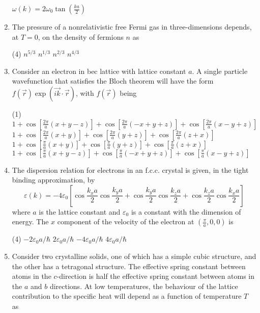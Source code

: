 \begin{enumerate}
\begin{tasks}
\task[\textbf{D.}] $\omega(k)=2 \omega_{0} \tan \left(\frac{k a}{2}\right)$
\end{tasks}
	\item The pressure of a nonrelativistic free Fermi gas in three-dimensions depends, at $T=0$, on the density of fermions $n$ as
	{}
\begin{tasks}(4)
\task[\textbf{A.}] $n^{5 / 3}$
\task[\textbf{B.}] $n^{1 / 3}$
\task[\textbf{C.}] $n^{2 / 3}$
\task[\textbf{D.}] $n^{4 / 3}$
\end{tasks}
	\item Consider an electron in bec lattice with lattice constant $a$. A single particle wavefunction that satisfies the Bloch theorem will have the form $f(\vec{r}) \exp (\overrightarrow{i k} \cdot \vec{r})$, with $f(\vec{r})$ being
	{}
\begin{tasks}(1)
\task[\textbf{A.}] $1+\cos \left[\frac{2 \pi}{a}(x+y-z)\right]+\cos \left[\frac{2 \pi}{a}(-x+y+z)\right]+\cos \left[\frac{2 \pi}{a}(x-y+z)\right]$
\task[\textbf{B.}] $1+\cos \left[\frac{2 \pi}{a}(x+y)\right]+\cos \left[\frac{2 \pi}{a}(y+z)\right]+\cos \left[\frac{2 \pi}{a}(z+x)\right]$
\task[\textbf{C.}] $1+\cos \left[\frac{\pi}{a}(x+y)\right]+\cos \left[\frac{\pi}{a}(y+z)\right]+\cos \left[\frac{\pi}{a}(z+x)\right]$
\task[\textbf{D.}] $1+\cos \left[\frac{\pi}{a}(x+y-z)\right]+\cos \left[\frac{\pi}{a}(-x+y+z)\right]+\cos \left[\frac{\pi}{a}(x-y+z)\right]$
\end{tasks}
	\item The dispersion relation for electrons in an f.c.c. crystal is given, in the tight binding approximation, by
	$$
	\varepsilon(k)=-4 \varepsilon_{0}\left[\cos \frac{k_{x} a}{2} \cos \frac{k_{y} a}{2}+\cos \frac{k_{y} a}{2} \cos \frac{k_{z} a}{2}+\cos \frac{k_{z} a}{2} \cos \frac{k_{x} a}{2}\right]
	$$
	where $a$ is the lattice constant and $\varepsilon_{0}$ is a constant with the dimension of energy. The $x$ component of the velocity of the electron at $\left(\frac{\pi}{a}, 0,0\right)$ is
	{}
\begin{tasks}(4)
\task[\textbf{A.}] $-2 \varepsilon_{0} a / \hbar$
\task[\textbf{B.}] $2 \varepsilon_{0} a / \hbar$
\task[\textbf{C.}] $-4 \varepsilon_{0} a / \hbar$
\task[\textbf{D.}] $4 \varepsilon_{0} a / \hbar$
\end{tasks}
	\item Consider two crystalline solids, one of which has a simple cubic structure, and the other has a tetragonal structure. The effective spring constant between atoms in the $c$-direction is half the effective spring constant between atoms in the $a$ and $b$ directions. At low temperatures, the behaviour of the lattice contribution to the specific heat will depend as a function of temperature $T$ as

\end{enumerate}
